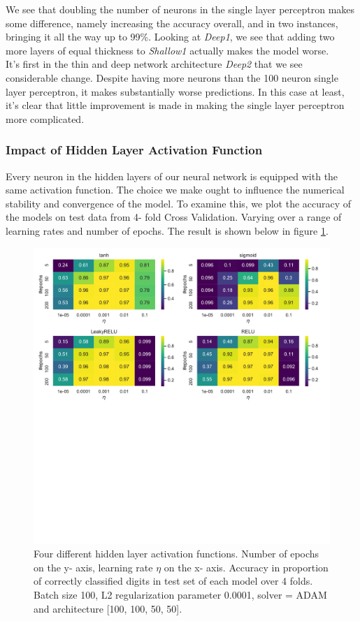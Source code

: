 \documentclass[11pt,a4paper,titlepage]{article}
\begin{document}
We see that doubling the number of neurons in the single layer perceptron makes some difference, namely increasing the accuracy overall, and in two instances, bringing it all the way up to 99\%. Looking at \textit{Deep1}, we see that adding two more layers of equal thickness to \textit{Shallow1} actually makes the model worse.\\It's first in the thin and deep network architecture \textit{Deep2} that we see considerable change. Despite having more neurons than the 100 neuron single layer perceptron, it makes substantially worse predictions. In this case at least, it's clear that little improvement is made in making the single layer perceptron more complicated.

\subsubsection{Impact of Hidden Layer Activation Function}
Every neuron in the hidden layers of our neural network is equipped with the same activation function. The choice we make ought to influence the numerical stability and convergence of the model. To examine this, we plot the accuracy of the models on test data from 4- fold Cross Validation. Varying over a range of learning rates and number of epochs. The result is shown below in figure \ref{NN_activation}.

\begin{figure}[H]
\centering

\includegraphics[trim=0cm 12.0cm 0cm 0.0cm, clip=true,scale = 0.6]{Activation_function_d.pdf}
\caption[NN Hidden layer Activation]{Four different hidden layer activation functions. Number of epochs on the y- axis, learning rate $\eta$ on the x- axis. Accuracy in proportion of correctly classified digits in test set of each model over 4 folds. Batch size 100, L2 regularization parameter 0.0001, solver = ADAM and architecture [100, 100, 50, 50].}\label{NN_activation}
\end{figure}
\end{document}
